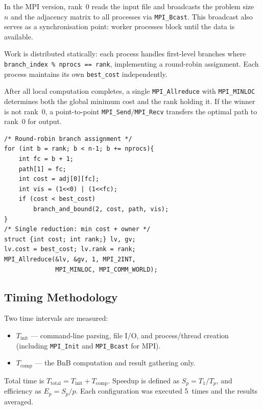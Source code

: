 \documentclass[conference]{IEEEtran}
\begin{document}
In the MPI version, rank~0 reads the input file and broadcasts the
problem size~$n$ and the adjacency matrix to all processes via
\texttt{MPI\_Bcast}. This broadcast also serves as a synchronisation point:
worker processes block until the data is available.

Work is distributed statically: each process handles first-level branches
where \texttt{branch\_index \% nprocs == rank}, implementing a round-robin
assignment. Each process maintains its own \texttt{best\_cost} independently.

After all local computation completes, a single
\texttt{MPI\_Allreduce} with \texttt{MPI\_MINLOC} determines both the global
minimum cost and the rank holding it. If the winner is not rank~0, a
point-to-point \texttt{MPI\_Send}/\texttt{MPI\_Recv} transfers the optimal
path to rank~0 for output.

\begin{lstlisting}[caption={MPI work distribution and result gathering},label={lst:mpi}]
/* Round-robin branch assignment */
for (int b = rank; b < n-1; b += nprocs){
    int fc = b + 1;
    path[1] = fc;
    int cost = adj[0][fc];
    int vis = (1<<0) | (1<<fc);
    if (cost < best_cost)
        branch_and_bound(2, cost, path, vis);
}
/* Single reduction: min cost + owner */
struct {int cost; int rank;} lv, gv;
lv.cost = best_cost; lv.rank = rank;
MPI_Allreduce(&lv, &gv, 1, MPI_2INT,
              MPI_MINLOC, MPI_COMM_WORLD);
\end{lstlisting}

\subsection{Timing Methodology}

Two time intervals are measured:
\begin{itemize}
  \item $T_{\mathrm{init}}$ --- command-line parsing, file I/O, and
        process/thread creation (including \texttt{MPI\_Init} and
        \texttt{MPI\_Bcast} for MPI).
  \item $T_{\mathrm{comp}}$ --- the BnB computation and result gathering
        only.
\end{itemize}
Total time is $T_{\mathrm{total}} = T_{\mathrm{init}} + T_{\mathrm{comp}}$.
Speedup is defined as $S_p = T_1 / T_p$, and efficiency as
$E_p = S_p / p$. Each configuration was executed 5~times and the results
averaged.

\end{document}
